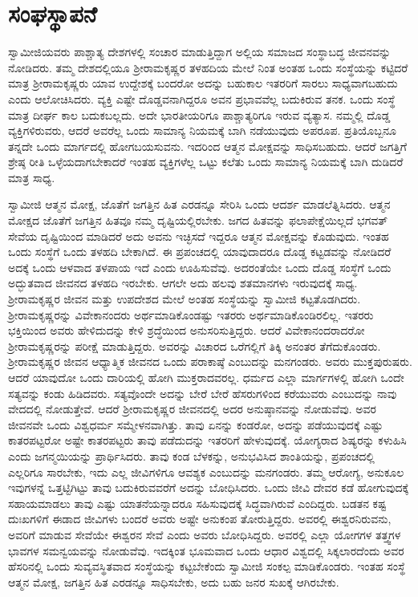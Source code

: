 
\chapter{ಸಂಘಸ್ಥಾಪನೆ}

 ಸ್ವಾಮೀಜಿಯವರು ಪಾಶ್ಚಾತ್ಯ ದೇಶಗಳಲ್ಲಿ ಸಂಚಾರ ಮಾಡುತ್ತಿದ್ದಾಗ ಅಲ್ಲಿಯ ಸಮಾಜದ ಸಂಸ್ಥಾಬದ್ಧ ಜೀವನವನ್ನು ನೋಡಿದರು. ತಮ್ಮ ದೇಶದಲ್ಲಿಯೂ ಶ‍್ರೀರಾಮಕೃಷ್ಣರ ತಳಹದಿಯ ಮೇಲೆ ನಿಂತ ಅಂತಹ ಒಂದು ಸಂಸ್ಥೆಯನ್ನು ಕಟ್ಟಿದರೆ ಮಾತ್ರ ಶ‍್ರೀರಾಮಕೃಷ್ಣರು ಯಾವ ಉದ್ದೇಶಕ್ಕೆ ಬಂದರೋ ಅದನ್ನು ಬಹುಕಾಲ ಇತರರಿಗೆ ಸಾರಲು ಸಾಧ್ಯವಾಗಬಹುದು ಎಂದು ಆಲೋಚಿಸಿದರು. ವ್ಯಕ್ತಿ ಎಷ್ಟೇ ದೊಡ್ಡವನಾಗಿದ್ದರೂ ಅವನ ಪ್ರಭಾವವೆಲ್ಲ ಬದುಕಿರುವ ತನಕ. ಒಂದು ಸಂಸ್ಥೆ ಮಾತ್ರ ದೀರ್ಘ ಕಾಲ ಬದುಕಬಲ್ಲದು. ಅದೇ ಭಾರತೀಯರಿಗೂ‌ ಪಾಶ್ಚಾತ್ಯರಿಗೂ ಇರುವ ವ್ಯತ್ಯಾಸ. ನಮ್ಮಲ್ಲಿ ದೊಡ್ಡ ವ್ಯಕ್ತಿಗಳಿರುವರು, ಆದರೆ ಅವರೆಲ್ಲ ಒಂದು ಸಾಮಾನ್ಯ ನಿಯಮಕ್ಕೆ ಬಾಗಿ ನಡೆಯುವುದು ಅಪರೂಪ. ಪ್ರತಿಯೊಬ್ಬನೂ ತನ್ನದೇ ಒಂದು ಮಾರ್ಗದಲ್ಲಿ ಹೋಗಬಯಸುವನು. ಇದರಿಂದ ಆತ್ಮನ ಮೋಕ್ಷವನ್ನು ಸಾಧಿಸಬಹುದು. ಆದರೆ ಜಗತ್ತಿಗೆ ಶ್ರೇಷ್ಠ ರೀತಿ ಒಳ್ಳೆಯದಾಗಬೇಕಾದರೆ ಇಂತಹ ವ್ಯಕ್ತಿಗಳೆಲ್ಲ ಒಟ್ಟು ಕಲೆತು ಒಂದು ಸಾಮಾನ್ಯ ನಿಯಮಕ್ಕೆ ಬಾಗಿ ದುಡಿದರೆ ಮಾತ್ರ ಸಾಧ್ಯ. 

 ಸ್ವಾಮೀಜಿ ಆತ್ಮನ ಮೋಕ್ಷ, ಜೊತೆಗೆ ಜಗತ್ತಿನ ಹಿತ ಎರಡನ್ನೂ ಸೇರಿಸಿ ಒಂದು ಆದರ್ಶ ಮಾಡಲೆತ್ನಿಸಿದರು. ಆತ್ಮನ ಮೋಕ್ಷದ ಜೊತೆಗೆ ಜಗತ್ತಿನ ಹಿತವೂ ನಮ್ಮ ದೃಷ್ಟಿಯಲ್ಲಿರಬೇಕು. ಜಗದ ಹಿತವನ್ನು ಫಲಾಪೇಕ್ಷೆಯಿಲ್ಲದೆ ಭಗವತ್ ಸೇವೆಯ ದೃಷ್ಟಿಯಿಂದ ಮಾಡಿದರೆ ಅದು ಅವನು ಇಚ್ಛಿಸದೆ ಇದ್ದರೂ ಆತ್ಮನ ಮೋಕ್ಷವನ್ನು ಕೊಡುವುದು. ಇಂತಹ ಒಂದು ಸಂಸ್ಥೆಗೆ ಒಂದು ತಳಹದಿ ಬೇಕಾಗಿದೆ. ಈ ಪ್ರಪಂಚದಲ್ಲಿ ಯಾವುದಾದರೂ ದೊಡ್ಡ ಕಟ್ಟಡವನ್ನು ನೋಡಿದರೆ ಅದಕ್ಕೆ ಒಂದು ಆಳವಾದ ತಳಪಾಯ ಇದೆ ಎಂದು ಊಹಿಸುವೆವು. ಅದರಂತೆಯೇ ಒಂದು ದೊಡ್ಡ ಸಂಸ್ಥೆಗೆ ಒಂದು ಅದ್ಭುತವಾದ ಜೀವನದ ತಳಹದಿ ಇರಬೇಕು. ಆಗಲೇ ಅದು ಹಲವು ಶತಮಾನಗಳು ಇರುವುದಕ್ಕೆ ಸಾಧ್ಯ. ಶ‍್ರೀರಾಮಕೃಷ್ಣರ ಜೀವನ ಮತ್ತು ಉಪದೇಶದ ಮೇಲೆ ಅಂತಹ ಸಂಸ್ಥೆಯನ್ನು ಸ್ವಾಮೀಜಿ ಕಟ್ಟತೊಡಗಿದರು. ಶ‍್ರೀರಾಮಕೃಷ್ಣರನ್ನು ವಿವೇಕಾನಂದರು ಅರ್ಥಮಾಡಿಕೊಂಡಷ್ಟು ಇತರರು ಅರ್ಥಮಾಡಿಕೊಂಡಿರಲಿಲ್ಲ. ಇತರರು ಭಕ್ತಿಯಿಂದ ಅವರು ಹೇಳಿದುದನ್ನು ಕೇಳಿ ಶ್ರದ್ಧೆಯಿಂದ ಅನುಸರಿಸುತ್ತಿದ್ದರು. ಆದರೆ ವಿವೇಕಾನಂದರಾದರೋ ಶ‍್ರೀರಾಮಕೃಷ್ಣರನ್ನು ಪರೀಕ್ಷೆ ಮಾಡುತ್ತಿದ್ದರು. ಅವರನ್ನು ವಿಚಾರದ ಒರೆಗಲ್ಲಿಗೆ ತಿಕ್ಕಿ ಅನಂತರ ತೆಗೆದುಕೊಂಡರು. ಶ‍್ರೀರಾಮಕೃಷ್ಣರ ಜೀವನ ಆಧ್ಯಾತ್ಮಿಕ ಜೀವನದ ಒಂದು ಪರಾಕಾಷ್ಠೆ ಎಂಬುದನ್ನು ಮನಗಂಡರು. ಅವರು ಮುಕ್ತಪುರುಷರು. ಆದರೆ ಯಾವುದೋ ಒಂದು ದಾರಿಯಲ್ಲಿ ಹೋಗಿ ಮುಕ್ತರಾದವರಲ್ಲ. ಧರ್ಮದ ಎಲ್ಲಾ ಮಾರ್ಗಗಳಲ್ಲಿ ಹೋಗಿ ಒಂದೇ ಸತ್ಯವನ್ನು ಕಂಡು ಹಿಡಿದವರು. ಸತ್ಯವೊಂದೇ ಅದನ್ನು ಬೇರೆ ಬೇರೆ ಹೆಸರುಗಳಿಂದ ಕರೆಯುವರು ಎಂಬುದನ್ನು ನಾವು ವೇದದಲ್ಲಿ ನೋಡುತ್ತೇವೆ. ಆದರೆ ಶ‍್ರೀರಾಮಕೃಷ್ಣರ ಜೀವನದಲ್ಲಿ ಅದರ ಅನುಷ್ಠಾನವನ್ನು ನೋಡುವೆವು. ಅವರ ಜೀವನವೇ ಒಂದು ವಿಶ್ವಧರ್ಮ ಸಮ್ಮೇಳನವಾಗಿತ್ತು. ತಾವು ಏನನ್ನು ಕಂಡರೋ, ಅದನ್ನು ಪಡೆಯುವುದಕ್ಕೆ ಎಷ್ಟು ಕಾತರಪಟ್ಟರೋ ಅಷ್ಟೇ ಕಾತರಪಟ್ಟರು ತಾವು ಪಡೆದುದನ್ನು ಇತರರಿಗೆ ಹೇಳುವುದಕ್ಕೆ. ಯೋಗ್ಯರಾದ ಶಿಷ್ಯರನ್ನು ಕಳುಹಿಸಿ ಎಂದು ಜಗನ್ಮಯಿಯನ್ನು ಪ್ರಾರ್ಥಿಸಿದರು. ತಾವು ಕಂಡ ಬೆಳಕನ್ನು, ಅನುಭವಿಸಿದ ಶಾಂತಿಯನ್ನು, ಪ್ರಪಂಚದಲ್ಲಿ ಎಲ್ಲರಿಗೂ ಸಾರಬೇಕು, ಇದು ಎಲ್ಲ ಜೀವಿಗಳಿಗೂ ಆವಶ್ಯಕ ಎಂಬುದನ್ನು ಮನಗಂಡರು. ತಮ್ಮ ಆರೋಗ್ಯ, ಅನುಕೂಲ ಇವುಗಳನ್ನೆ ಒತ್ತಟ್ಟಿಗಿಟ್ಟು ತಾವು ಬದುಕಿರುವವರೆಗೆ ಅದನ್ನು ಬೋಧಿಸಿದರು. ಒಂದು ಜೀವಿ ದೇವರ ಕಡೆ ಹೋಗುವುದಕ್ಕೆ ಸಹಾಯಮಾಡಲು ತಾವು ಎಷ್ಟು ಯಾತನೆಯನ್ನಾದರೂ ಸಹಿಸುವುದಕ್ಕೆ ಸಿದ್ಧವಾಗಿರುವೆ ಎಂದಿದ್ದರು. ಬಡತನ ಕಷ್ಟ ದುಃಖಗಳಿಗೆ ಈಡಾದ ಜೀವಿಗಳು ಬಂದರೆ ಅವರು ಅಷ್ಟೇ ಅನುಕಂಪ ತೋರುತ್ತಿದ್ದರು. ಅವರಲ್ಲಿ ಈಶ್ವರನಿರುವನು, ಅವರಿಗೆ ಮಾಡುವ ಸೇವೆಯೇ ಈಶ್ವರನ ಸೇವೆ ಎಂದು ಅವರು ಬೋಧಿಸಿದ್ದರು. ಅವರಲ್ಲಿ ಎಲ್ಲಾ ಯೋಗಗಳ ತತ್ತ್ವಗಳ ಭಾವಗಳ ಸಮನ್ವಯವನ್ನು ನೋಡುವೆವು. ಇದಕ್ಕಿಂತ ಭೂಮವಾದ ಒಂದು ಆಧಾರ ವಿಶ್ವದಲ್ಲಿ ಸಿಕ್ಕಲಾರದೆಂದು ಅವರ ಹೆಸರಿನಲ್ಲಿ ಒಂದು ಸುವ್ಯವಸ್ಥಿತವಾದ ಸಂಸ್ಥೆಯನ್ನು ಕಟ್ಟಬೇಕೆಂದು ಸ್ವಾಮೀಜಿ ಸಂಕಲ್ಪ ಮಾಡಿಕೊಂಡರು. ಇಂತಹ ಸಂಸ್ಥೆ ಆತ್ಮನ ಮೋಕ್ಷ, ಜಗತ್ತಿನ ಹಿತ ಎರಡನ್ನೂ ಸಾಧಿಸಬೇಕು, ಅದು ಬಹು ಜನರ ಸುಖಕ್ಕೆ ಆಗಿರಬೇಕು. 

